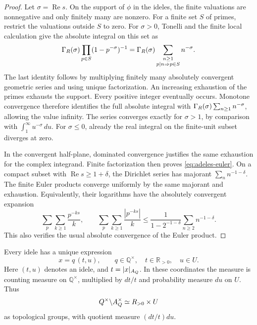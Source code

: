 \begin{proof}
Let \(\sigma=\operatorname{Re}s\). On the support of \(\phi\) in the
ideles, the finite valuations are nonnegative and only finitely many are
nonzero. For a finite set \(S\) of primes, restrict the valuations outside
\(S\) to zero. For \(\sigma>0\), Tonelli and the finite local calculation
give the absolute integral on this set as
\[
 \Gamma_{R}(\sigma)\prod_{p\in S}(1-p^{-\sigma})^{-1}
 =\Gamma_{R}(\sigma)
   \sum_{\substack{n\geq1\\p\mid n\Rightarrow p\in S}}n^{-\sigma}.
\]
The last identity follows by multiplying finitely many absolutely
convergent geometric series and using unique factorization.
An increasing exhaustion of the primes exhausts the support.
Every positive integer eventually occurs. Monotone convergence therefore
identifies the full absolute integral with
\(\Gamma_{R}(\sigma)\sum_{n\geq1}n^{-\sigma}\), allowing the value infinity.
The series converges exactly for \(\sigma>1\), by comparison with
\(\int_1^\infty u^{-\sigma}\,du\).
For \(\sigma\leq0\), already the real integral on the finite-unit subset
diverges at zero.

In the convergent half-plane, dominated convergence justifies the same
exhaustion for the complex integrand. Finite factorization then proves
\eqref{eq:adeles-euler}. On a compact subset with
\(\operatorname{Re}s\geq1+\delta\), the Dirichlet series has majorant
\(\sum_n n^{-1-\delta}\). The finite Euler products converge uniformly
by the same majorant and exhaustion. Equivalently, their logarithms have
the absolutely convergent expansion
\[
 \sum_p\sum_{k\geq1}\frac{p^{-ks}}{k},\qquad
 \sum_p\sum_{k\geq1}\frac{|p^{-ks}|}{k}
 \leq\frac{1}{1-2^{-1-\delta}}\sum_{n\geq2}n^{-1-\delta}.
\]
This also verifies the usual absolute convergence of the Euler product.
\end{proof}

\begin{proposition}
\label{prop:adeles-idele-domain}
Every idele has a unique expression
\begin{equation}
 x=q\,(t,u),\qquad q\in\mathbb Q^\times,\quad t\in\mathbb R_{>0},
 \quad u\in U.
 \label{eq:adeles-idele-domain}
\end{equation}
Here \((t,u)\) denotes an idele, and \(t=|x|_{A_{Q}}\).
In these coordinates the measure is counting measure on
\(\mathbb Q^\times\), multiplied by \(dt/t\) and probability measure
\(du\) on \(U\). Thus
\[
 Q^\times\backslash A_{Q}^\times
 \simeq R_{>0}\times U
\]
as topological groups, with quotient measure \((dt/t)du\).
\end{proposition}

